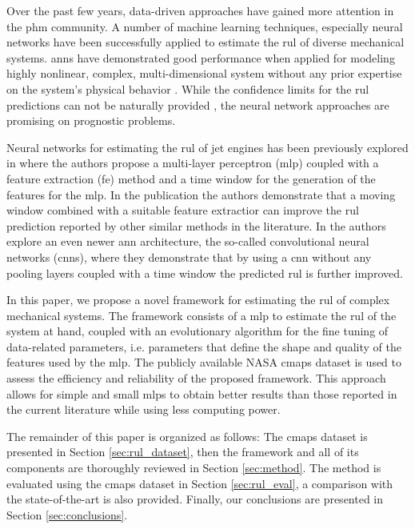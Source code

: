 Over the past few years, data-driven approaches have gained more attention in the \gls{phm} community. A number of machine learning techniques, especially neural networks have been successfully applied to estimate the \gls{rul} of diverse mechanical systems. \glspl{ann} have demonstrated good performance when applied for modeling highly nonlinear, complex, multi-dimensional system without any prior expertise on the system's physical behavior \citep{Li2018}. While the confidence limits for the \gls{rul} predictions can not be naturally provided \citep{Sikorska2011}, the neural network approaches are promising on prognostic problems.

Neural networks for estimating the \gls{rul} of jet engines has been previously explored in \citep{Lim2016} where the authors propose a multi-layer perceptron (\gls{mlp}) coupled with a feature extraction (\gls{fe}) method and a time window for the generation of the features for the \gls{mlp}. In the publication the authors demonstrate that a moving window combined with a suitable feature extractior can improve the \gls{rul} prediction reported by other similar methods in the literature. In \citep{Li2018} the authors explore an even newer \gls{ann} architecture, the so-called convolutional neural networks (\glspl{cnn}), where they demonstrate that by using a \gls{cnn} without any pooling layers coupled with a time window the predicted \gls{rul} is further improved.

In this paper, we propose a novel framework for estimating the \gls{rul} of complex mechanical systems. The framework consists of a \gls{mlp} to estimate the \gls{rul} of the system at hand, coupled with an evolutionary algorithm for the fine tuning of data-related parameters, i.e. parameters that define the shape and quality of the features used by the \gls{mlp}. The publicly available NASA \gls{cmaps} dataset \citep{CMAPS2008} is used to assess the efficiency and reliability of the proposed framework. This approach allows for simple and small \glspl{mlp} to obtain better results than those reported in the current literature while using less computing power. 

The remainder of this paper is organized as follows: The \gls{cmaps} dataset is presented in Section \ref{sec:rul_dataset}, then the framework and all of its components are thoroughly reviewed in Section \ref{sec:method}. The method is evaluated using the \gls{cmaps} dataset in Section \ref{sec:rul_eval}, a comparison with the state-of-the-art is also provided. Finally, our conclusions are presented in Section \ref{sec:conclusions}.